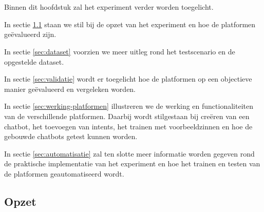 
\chapter{}
\label{ch:methodologie}

Binnen dit hoofdstuk zal het experiment verder worden toegelicht.

In sectie \ref{sec:opzet} staan we stil bij de opzet van het experiment en hoe de platformen geëvalueerd zijn.

In sectie \ref{sec:dataset} voorzien we meer uitleg rond het testscenario en de opgestelde dataset.

In sectie \ref{sec:validatie} wordt er toegelicht hoe de platformen op een objectieve manier geëvalueerd en vergeleken worden.

In sectie \ref{sec:werking-platformen} illustreren we de werking en functionaliteiten van de verschillende platformen. Daarbij wordt stilgestaan bij creëren van een chatbot, het toevoegen van intents, het trainen met voorbeeldzinnen en hoe de gebouwde chatbots getest kunnen worden. 

In sectie \ref{sec:automatisatie} zal ten slotte meer informatie worden gegeven rond de praktische implementatie van het experiment en hoe het trainen en testen van de platformen geautomatiseerd wordt.


\section{Opzet}
\label{sec:opzet}

